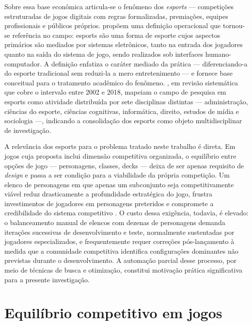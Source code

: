 Sobre essa base econômica articula-se o fenômeno dos \textit{esports} --- competições estruturadas de jogos digitais com regras formalizadas, premiações, equipes profissionais e públicos próprios.  propõem uma definição operacional que tornou-se referência no campo: esports são uma forma de esporte cujos aspectos primários são mediados por sistemas eletrônicos, tanto na entrada dos jogadores quanto na saída do sistema de jogo, sendo realizados sob interfaces humano-computador. A definição enfatiza o caráter mediado da prática --- diferenciando-a do esporte tradicional sem reduzi-la a mero entretenimento --- e fornece base conceitual para o tratamento acadêmico do fenômeno. , em revisão sistemática que cobre o intervalo entre 2002 e 2018, mapeiam o campo de pesquisa em esports como atividade distribuída por sete disciplinas distintas --- administração, ciências do esporte, ciências cognitivas, informática, direito, estudos de mídia e sociologia ---, indicando a consolidação dos esports como objeto multidisciplinar de investigação.

A relevância dos esports para o problema tratado neste trabalho é direta. Em jogos cuja proposta inclui dimensão competitiva organizada, o equilíbrio entre opções de jogo --- personagens, classes, decks --- deixa de ser apenas requisito de \textit{design} e passa a ser condição para a viabilidade da própria competição. Um elenco de personagens em que apenas um subconjunto seja competitivamente viável reduz drasticamente a profundidade estratégica do jogo, frustra investimentos de jogadores em personagens preteridos e compromete a credibilidade do sistema competitivo \cite{adams2014fundamentals}. O custo dessa exigência, todavia, é elevado: o balanceamento manual de elencos com dezenas de personagens demanda iterações sucessivas de desenvolvimento e teste, normalmente sustentadas por jogadores especializados, e frequentemente requer correções pós-lançamento à medida que a comunidade competitiva identifica configurações dominantes não previstas durante o desenvolvimento. A automação parcial desse processo, por meio de técnicas de busca e otimização, constitui motivação prática significativa para a presente investigação.

\section{Equilíbrio competitivo em jogos}
\label{sec: equilibrio}

